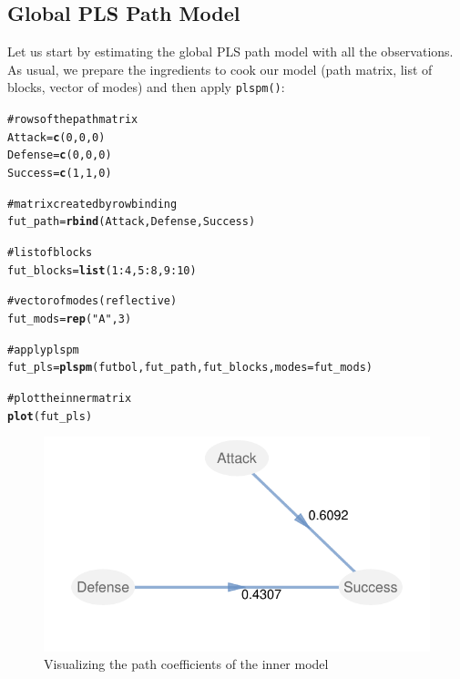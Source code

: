 \documentclass[12pt]{book}\usepackage{graphicx, color}
\makeatletter
\newcommand{\hlfunctioncall}[1]{\textcolor[rgb]{0.501960784313725,0,0.329411764705882}{\textbf{#1}}}%
\newcommand{\hlstring}[1]{\textcolor[rgb]{0.6,0.6,1}{#1}}%
\newcommand{\hlcomment}[1]{\textcolor[rgb]{0.180392156862745,0.6,0.341176470588235}{#1}}%
\newenvironment{kframe}{%
 \def\at@end@of@kframe{}%
 \ifinner\ifhmode%
  \def\at@end@of@kframe{\end{minipage}}%
  \begin{minipage}{\columnwidth}%
 \fi\fi%
 \def\FrameCommand##1{\hskip\@totalleftmargin \hskip-\fboxsep
 \colorbox{shadecolor}{##1}\hskip-\fboxsep
     \hskip-\linewidth \hskip-\@totalleftmargin \hskip\columnwidth}%
 \MakeFramed {\advance\hsize-\width
   \@totalleftmargin\z@ \linewidth\hsize
   \@setminipage}}%
 {\par\unskip\endMakeFramed%
 \at@end@of@kframe}
\newenvironment{knitrout}{}{} %
\newcommand{\fplspm}{\texttt{plspm()}}
\makeatother
\begin{document}
\subsection{Global PLS Path Model}
Let us start by estimating the global PLS path model with all the observations. As usual, we prepare the ingredients to cook our model (path matrix, list of blocks, vector of modes) and then apply \fplspm{}:
\begin{knitrout}
\color{fgcolor}\begin{kframe}
\begin{alltt}
\hlcomment{# rows of the path matrix}
Attack = \hlfunctioncall{c}(0, 0, 0)
Defense = \hlfunctioncall{c}(0, 0, 0)
Success = \hlfunctioncall{c}(1, 1, 0)

\hlcomment{# matrix created by row binding}
fut_path = \hlfunctioncall{rbind}(Attack, Defense, Success)

\hlcomment{# list of blocks}
fut_blocks = \hlfunctioncall{list}(1:4, 5:8, 9:10)

\hlcomment{# vector of modes (reflective)}
fut_mods = \hlfunctioncall{rep}(\hlstring{"A"}, 3)

\hlcomment{# apply plspm}
fut_pls = \hlfunctioncall{plspm}(futbol, fut_path, fut_blocks, modes = fut_mods)
\end{alltt}
\end{kframe}
\end{knitrout}


\begin{knitrout}
\color{fgcolor}\begin{kframe}
\begin{alltt}
\hlcomment{# plot the inner matrix}
\hlfunctioncall{plot}(fut_pls)
\end{alltt}
\end{kframe}\begin{figure}[h]


{\centering \includegraphics[width=.65\linewidth,height=.4\linewidth]{figure/fut_pls_path_coeffs} 

}

\caption[Visualizing the path coefficients of the inner model]{Visualizing the path coefficients of the inner model\label{fig:fut_pls_path_coeffs}}
\end{figure}


\end{knitrout}
\end{document}
